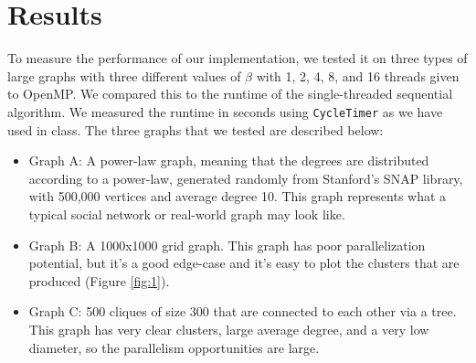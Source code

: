 \documentclass[11pt]{scrartcl}
\theoremstyle{plain}
\theoremstyle{definition}
\theoremstyle{remark}
\begin{document}
\section{Results}
To measure the performance of our implementation, we tested it on three types of large graphs with three different values of $\beta$ with 1, 2, 4, 8, and 16 threads given to OpenMP. We compared this to the runtime of the single-threaded sequential algorithm. We measured the runtime in seconds using \texttt{CycleTimer} as we have used in class. The three graphs that we tested are described below:
\begin{itemize}
\item Graph A: A power-law graph, meaning that the degrees are distributed according to a power-law, generated randomly from Stanford's SNAP library, with 500,000 vertices and average degree 10. This graph represents what a typical social network or real-world graph may look like.
\item Graph B: A 1000x1000 grid graph. This graph has poor parallelization potential, but it's a good edge-case and it's easy to plot the clusters that are produced (Figure \ref{fig:1}).
\item Graph C: 500 cliques of size 300 that are connected to each other via a tree. This graph has very clear clusters, large average degree, and a very low diameter, so the parallelism opportunities are large.
\end{itemize}
\end{document}
